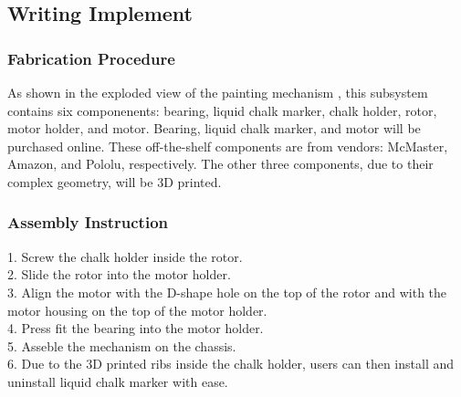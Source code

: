 
\subsection{Writing Implement}
\label{sec:hardware_writing_implement}

\subsubsection{Fabrication Procedure}
\label{sec:writing_fab}
As shown in the exploded view of the painting mechanism , this subsystem contains six componenents: bearing, liquid chalk marker, chalk holder, rotor, motor holder, and motor. Bearing, liquid chalk marker, and motor will be purchased online. These off-the-shelf components are from vendors: McMaster, Amazon, and Pololu, respectively. The other three components, due to their complex geometry, will be 3D printed. 

\subsubsection{Assembly Instruction}
\label{sec:writing_assemb}
1. Screw the chalk holder inside the rotor.\\
2. Slide the rotor into the motor holder. \\
3. Align the motor with the D-shape hole on the top of the rotor and with the motor housing on the top of the motor holder.\\
4. Press fit the bearing into the motor holder.\\
5. Asseble the mechanism on the chassis.\\
6. Due to the 3D printed ribs inside the chalk holder, users can then install and uninstall liquid chalk marker with ease.